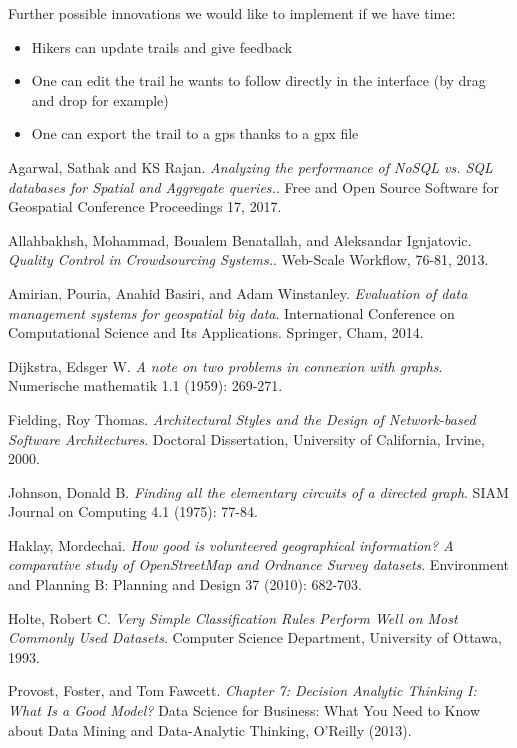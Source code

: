 \documentclass[sigconf]{acmart}
\begin{document}
Further possible innovations we would like to implement if we have time:
\begin{itemize}
	\item Hikers can update trails and give feedback
	\item One can edit the trail he wants to follow directly in the interface (by drag and drop for example)
	\item One can export the trail to a gps thanks to a gpx file
\end{itemize}


\begin{thebibliography}{9}
\bibitem{} 
Agarwal, Sathak and KS Rajan. 
\textit{Analyzing the performance of NoSQL vs. SQL databases for Spatial and Aggregate queries.}. 
Free and Open Source Software for Geospatial Conference Proceedings 17, 2017.
 
\bibitem{} 
Allahbakhsh, Mohammad, Boualem Benatallah, and Aleksandar Ignjatovic.
\textit{Quality Control in Crowdsourcing Systems.}.
Web-Scale Workflow, 76-81, 2013.

\bibitem{} 
Amirian, Pouria, Anahid Basiri, and Adam Winstanley.
\textit{Evaluation of data management systems for geospatial big data}.
International Conference on Computational Science and Its Applications. Springer, Cham, 2014.

\bibitem{} 
Dijkstra, Edsger W.
\textit{A note on two problems in connexion with graphs}.
Numerische mathematik 1.1 (1959): 269-271.

\bibitem{} 
Fielding, Roy Thomas.
\textit{Architectural Styles and the Design of Network-based Software Architectures}.
Doctoral Dissertation, University of California, Irvine, 2000.

\bibitem{} 
Johnson, Donald B.
\textit{Finding all the elementary circuits of a directed graph}.
SIAM Journal on Computing 4.1 (1975): 77-84.

\bibitem{} 
Haklay, Mordechai.
\textit{How good is volunteered geographical information? A comparative study of OpenStreetMap and Ordnance Survey datasets}.
Environment and Planning B: Planning and Design 37 (2010): 682-703.

\bibitem{} 
Holte, Robert C.
\textit{Very Simple Classification Rules Perform Well on Most Commonly Used Datasets}.
Computer Science Department, University of Ottawa, 1993.

\bibitem{} 
Provost, Foster, and Tom Fawcett.
\textit{Chapter 7: Decision Analytic Thinking I: What Is a Good Model?}
Data Science for Business: What You Need to Know about Data Mining and Data-Analytic Thinking, O'Reilly (2013).


\end{thebibliography}
\end{document}
